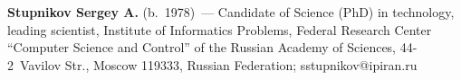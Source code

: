     \vspace*{3pt}
    
    \noindent
    \textbf{Stupnikov Sergey A.} (b.\ 1978)~--- Candidate of Science (PhD) in 
technology, leading scientist, Institute of Informatics Problems, Federal Research 
Center ``Computer Science and Control'' of the Russian Academy of Sciences, 44-2~Vavilov Str., Moscow 119333, Russian Federation; 
\mbox{sstupnikov@ipiran.ru}
  
\label{end\stat}

\renewcommand{\bibname}{\protect\rm Литература}    
   